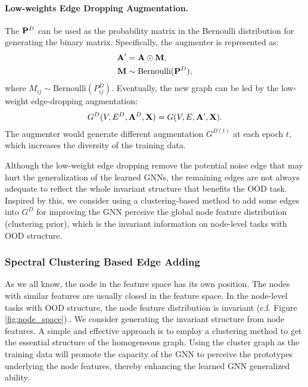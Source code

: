  \paragraph{Low-weights Edge Dropping Augmentation.} 
The  $\mathbf{P}^{D}$ can be used as the probability matrix in the Bernoulli distribution for generating the binary matrix. Specifically,  the augmenter is represented as:
\begin{align}
    \mathbf{A}' &= \mathbf{A} \odot \mathbf{M}, \\
    \mathbf{M} & \sim  \text{Bernoulli}(\mathbf{P}^D),
\end{align}
where $M_{ij} \sim \text{Bernoulli}(P^D_{ij})$.
Eventually, the new graph can be led by the low-weight edge-dropping augmentation:
\begin{align}
G^{D}(V, E^D, \mathbf{A}^D, \mathbf{X}) = G(V, E, \mathbf{A}', \mathbf{X}).
\end{align}
The augmenter would generate different augmentation $G^{D{(t)}}$ at each epoch $t$, which increases the diversity of the training data.   


Although the low-weight edge dropping remove the potential noise edge that may hurt the generalization of the learned GNNs, the remaining edges are not always adequate to reflect the whole invariant structure that benefits the OOD task. Inspired by this, we consider using a clustering-based method to add some edges into  $G^{D}$ for improving the GNN perceive the global node feature distribution (clustering prior), which is the invariant information on node-level tasks with OOD structure.



\subsubsection{Spectral Clustering Based Edge Adding}
As we all know, the node in the feature space has its own position. The nodes with similar features are usually closed in the feature space. In the node-level tasks with OOD structure, the node feature distribution is invariant (c.f. Figure \ref{fig:node_space})..
We consider generating the invariant structure from node features. A simple and effective approach is to  employ a clustering method to get the essential structure of the homogeneous graph. Using the cluster graph as the training data will promote the  capacity of the GNN to perceive the prototypes underlying the node features, thereby enhancing the learned GNN generalized ability.

